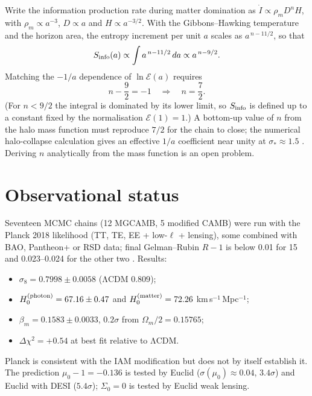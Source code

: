 \documentclass[12pt,a4paper]{article}
\begin{document}
Write the information production rate during matter domination as
$\dot I\propto\rho_m D^n H$, with $\rho_m\propto a^{-3}$, $D\propto a$ and
$H\propto a^{-3/2}$. With the Gibbons--Hawking temperature and the horizon area,
the entropy increment per unit $a$ scales as $a^{\,n-11/2}$, so that
\begin{equation}
S_{\rm info}(a)\propto\int a^{\,n-11/2}\,da\propto a^{\,n-9/2}.
\end{equation}
Matching the $-1/a$ dependence of $\ln\mathcal{E}(a)$ requires
\begin{equation}
n-\frac{9}{2}=-1\quad\Longrightarrow\quad n=\frac{7}{2}.
\label{eq:n}
\end{equation}
(For $n<9/2$ the integral is dominated by its lower limit, so $S_{\rm info}$ is
defined up to a constant fixed by the normalisation $\mathcal{E}(1)=1$.) A
bottom-up value of $n$ from the halo mass function must reproduce $7/2$ for the
chain to close; the numerical halo-collapse calculation gives an effective $1/a$
coefficient near unity at $\sigma_*\approx1.5$ \citep{IAM_Zurek}. Deriving $n$
analytically from the mass function is an open problem.

\section{Observational status}
\label{sec:obs}

Seventeen MCMC chains (12 MGCAMB, 5 modified CAMB) were run with the Planck 2018
likelihood (TT, TE, EE + low-$\ell$ + lensing), some combined with BAO, Pantheon+ or
RSD data; final Gelman--Rubin $R-1$ is below 0.01 for 15 and 0.023--0.024 for the
other two \citep{IAM_obs}. Results:
\begin{itemize}
\item $\sigma_8=0.7998\pm0.0058$ (ΛCDM $0.809$);
\item $H_0^{(\rm photon)}=67.16\pm0.47$ and $H_0^{(\rm matter)}=72.26$ km\,s$^{-1}$\,Mpc$^{-1}$;
\item $\beta_m=0.1583\pm0.0033$, $0.2\sigma$ from $\Omega_m/2=0.15765$;
\item $\Delta\chi^2=+0.54$ at best fit relative to ΛCDM.
\end{itemize}
Planck is consistent with the IAM modification but does not by itself establish it.
The prediction $\mu_0-1=-0.136$ is tested by Euclid ($\sigma(\mu_0)\approx0.04$,
$3.4\sigma$) and Euclid with DESI ($5.4\sigma$); $\Sigma_0=0$ is tested by Euclid
weak lensing.
\end{document}
